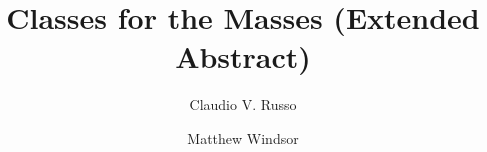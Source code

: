 \documentclass{elsarticle}
\begin{document}

%

\begin{frontmatter}
\title{Classes for the Masses (Extended Abstract)  }   
\author{Claudio V. Russo}
\address{Microsoft Research Ltd, Cambridge, U.K.}
\author{Matthew Windsor}
\address{University of York}
 
%
%
%
%
%


\end{frontmatter}
\end{document}
